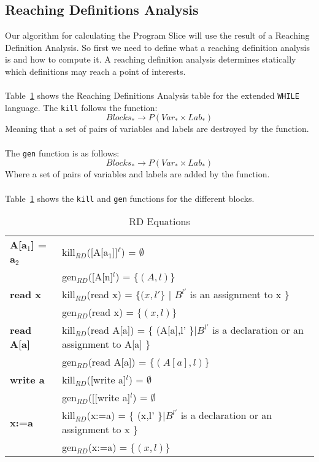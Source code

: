 \subsection{Reaching Definitions Analysis}
Our algorithm for calculating the Program Slice will use the result of a Reaching Definition Analysis. So first we need to define what a reaching definition analysis is and how to compute it. A reaching definition analysis determines statically which definitions may reach a point of interests.
\\\\
Table~\ref{table:rd_equations} shows the Reaching Definitions Analysis table for the extended \texttt{WHILE} language. The \texttt{kill} follows the function:
\begin{equation}
	Blocks_{*}\rightarrow P(Var_{*}\times Lab_{*})
\end{equation}
Meaning that a set of pairs of variables and labels are destroyed by the function.
\\\\
The \texttt{gen} function is as follows:
\begin{equation}
	Blocks_{*}\rightarrow P(Var_{*}\times Lab_{*})
\end{equation}
Where a set of pairs of variables and labels are added by the function.
\\\\
Table~\ref{table:rd_equations} shows the \texttt{kill} and \texttt{gen} functions for the different blocks.
\begin{table}[h]
    \begin{tabular}{l | l }
    \textbf{A[a$_1$] = a$_2$} & kill$_{RD}$([A[a$_1$]]$^\ell$) = $\emptyset$ \\
                              & gen$_{RD}$([A[n]$^l$) = $\{(A,l)\}$ \\

    \hline
    \textbf{read x} & kill$_{RD}$(read x) = $\{(x,l' \}$ | $B^{l'}$ is an assignment to x \} \\
                              & gen$_{RD}$(read x) = $\{(x,l)\}$ \\
							  
    \hline
    \textbf{read A[a]} & kill$_{RD}$(read A[a]) = \{ (A[a],l' \}|$B^{l'}$ is a declaration or an assignment to A[a] \} \\
                              & gen$_{RD}$(read A[a]) = $\{(A[a],l)\}$ \\
							  
    \hline
    \textbf{write a} &  kill$_{RD}$([write a]$^l$) = $\emptyset$ \\
                   &  gen$_{RD}$([[write a]$^l$) = $\emptyset$ \\

    \hline
    \textbf{x:=a} & kill$_{RD}$(x:=a) = \{ (x,l' \}|$B^{l'}$ is a declaration or an assignment to x \} \\
                              & gen$_{RD}$(x:=a) = $\{(x,l)\}$ \\
    \end{tabular}
    \centering
	\caption{RD Equations}
	\label{table:rd_equations}
\end{table}
